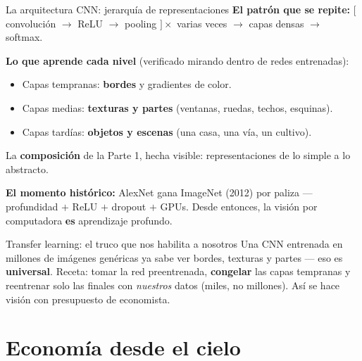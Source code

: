 \documentclass{beamer}
\newcommand{\1}{\mathbb{I}}
\begin{document}
\begin{frame}{La arquitectura CNN: jerarquía de representaciones}
\small
\textbf{El patrón que se repite:} $\big[$ convolución $\rightarrow$ ReLU $\rightarrow$ pooling $\big] \times$ varias veces $\rightarrow$ capas densas $\rightarrow$ softmax.
\pause

\vspace{0.15cm}
\textbf{Lo que aprende cada nivel} (verificado mirando dentro de redes entrenadas):
\begin{itemize}\itemsep3pt
  \item Capas tempranas: \textbf{bordes} y gradientes de color.
  \item Capas medias: \textbf{texturas y partes} (ventanas, ruedas, techos, esquinas).
  \item Capas tardías: \textbf{objetos y escenas} (una casa, una vía, un cultivo).
\end{itemize}
La \textbf{composición} de la Parte 1, hecha visible: representaciones de lo simple a lo abstracto. \pause

\vspace{0.15cm}
\textbf{El momento histórico:} AlexNet gana ImageNet (2012) por paliza --- profundidad $+$ ReLU $+$ dropout $+$ GPUs. Desde entonces, la visión por computadora \textbf{es} aprendizaje profundo.
\pause

\vspace{0.1cm}
\begin{block}{Transfer learning: el truco que nos habilita a nosotros}
Una CNN entrenada en millones de imágenes genéricas ya sabe ver bordes, texturas y partes --- eso es \textbf{universal}. Receta: tomar la red preentrenada, \textbf{congelar} las capas tempranas y reentrenar solo las finales con \emph{nuestros} datos (miles, no millones). Así se hace visión con presupuesto de economista.
\end{block}
\end{frame}


\section{Economía desde el cielo}
\begin{frame}[noframenumbering]
\tableofcontents[currentsection]
\end{frame}
\end{document}
